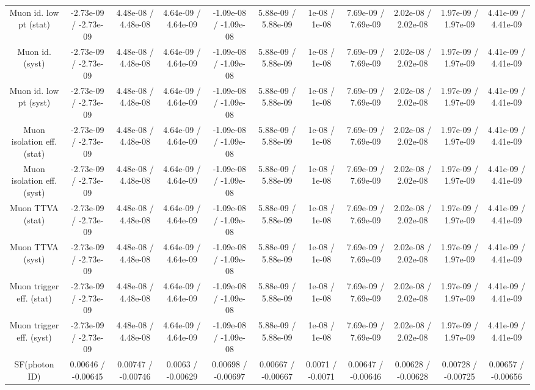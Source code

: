 {\begin{landscape}
\begin{longtable}{@{\extracolsep{\fill}}| *{11}{c|}}
  Muon id. low pt (stat) & -2.73e-09 / -2.73e-09 & 4.48e-08 / 4.48e-08 & 4.64e-09 / 4.64e-09 & -1.09e-08 / -1.09e-08 & 5.88e-09 / 5.88e-09 & 1e-08 / 1e-08 & 7.69e-09 / 7.69e-09 & 2.02e-08 / 2.02e-08 & 1.97e-09 / 1.97e-09 & 4.41e-09 / 4.41e-09 \\ 
  Muon id. (syst) & -2.73e-09 / -2.73e-09 & 4.48e-08 / 4.48e-08 & 4.64e-09 / 4.64e-09 & -1.09e-08 / -1.09e-08 & 5.88e-09 / 5.88e-09 & 1e-08 / 1e-08 & 7.69e-09 / 7.69e-09 & 2.02e-08 / 2.02e-08 & 1.97e-09 / 1.97e-09 & 4.41e-09 / 4.41e-09 \\ 
  Muon id. low pt (syst) & -2.73e-09 / -2.73e-09 & 4.48e-08 / 4.48e-08 & 4.64e-09 / 4.64e-09 & -1.09e-08 / -1.09e-08 & 5.88e-09 / 5.88e-09 & 1e-08 / 1e-08 & 7.69e-09 / 7.69e-09 & 2.02e-08 / 2.02e-08 & 1.97e-09 / 1.97e-09 & 4.41e-09 / 4.41e-09 \\ 
  Muon isolation eff. (stat) & -2.73e-09 / -2.73e-09 & 4.48e-08 / 4.48e-08 & 4.64e-09 / 4.64e-09 & -1.09e-08 / -1.09e-08 & 5.88e-09 / 5.88e-09 & 1e-08 / 1e-08 & 7.69e-09 / 7.69e-09 & 2.02e-08 / 2.02e-08 & 1.97e-09 / 1.97e-09 & 4.41e-09 / 4.41e-09 \\ 
  Muon isolation eff. (syst) & -2.73e-09 / -2.73e-09 & 4.48e-08 / 4.48e-08 & 4.64e-09 / 4.64e-09 & -1.09e-08 / -1.09e-08 & 5.88e-09 / 5.88e-09 & 1e-08 / 1e-08 & 7.69e-09 / 7.69e-09 & 2.02e-08 / 2.02e-08 & 1.97e-09 / 1.97e-09 & 4.41e-09 / 4.41e-09 \\ 
  Muon TTVA (stat) & -2.73e-09 / -2.73e-09 & 4.48e-08 / 4.48e-08 & 4.64e-09 / 4.64e-09 & -1.09e-08 / -1.09e-08 & 5.88e-09 / 5.88e-09 & 1e-08 / 1e-08 & 7.69e-09 / 7.69e-09 & 2.02e-08 / 2.02e-08 & 1.97e-09 / 1.97e-09 & 4.41e-09 / 4.41e-09 \\ 
  Muon TTVA (syst) & -2.73e-09 / -2.73e-09 & 4.48e-08 / 4.48e-08 & 4.64e-09 / 4.64e-09 & -1.09e-08 / -1.09e-08 & 5.88e-09 / 5.88e-09 & 1e-08 / 1e-08 & 7.69e-09 / 7.69e-09 & 2.02e-08 / 2.02e-08 & 1.97e-09 / 1.97e-09 & 4.41e-09 / 4.41e-09 \\ 
  Muon trigger eff. (stat) & -2.73e-09 / -2.73e-09 & 4.48e-08 / 4.48e-08 & 4.64e-09 / 4.64e-09 & -1.09e-08 / -1.09e-08 & 5.88e-09 / 5.88e-09 & 1e-08 / 1e-08 & 7.69e-09 / 7.69e-09 & 2.02e-08 / 2.02e-08 & 1.97e-09 / 1.97e-09 & 4.41e-09 / 4.41e-09 \\ 
  Muon trigger eff. (syst) & -2.73e-09 / -2.73e-09 & 4.48e-08 / 4.48e-08 & 4.64e-09 / 4.64e-09 & -1.09e-08 / -1.09e-08 & 5.88e-09 / 5.88e-09 & 1e-08 / 1e-08 & 7.69e-09 / 7.69e-09 & 2.02e-08 / 2.02e-08 & 1.97e-09 / 1.97e-09 & 4.41e-09 / 4.41e-09 \\ 
  SF(photon ID) & 0.00646 / -0.00645 & 0.00747 / -0.00746 & 0.0063 / -0.00629 & 0.00698 / -0.00697 & 0.00667 / -0.00667 & 0.0071 / -0.0071 & 0.00647 / -0.00646 & 0.00628 / -0.00628 & 0.00728 / -0.00725 & 0.00657 / -0.00656 \\ 

\end{longtable}
\end{landscape}}
